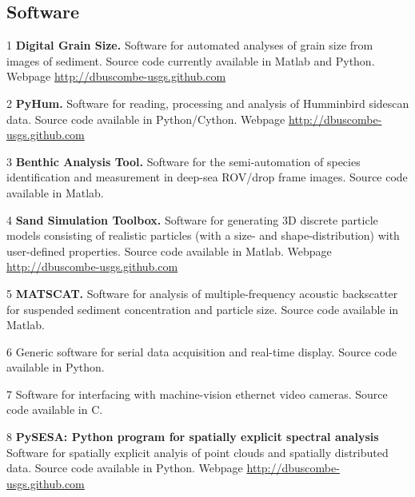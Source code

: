 \documentclass[margin,line]{resume}
\begin{document}
\begin{resume}
\begin{footnotesize}
\begin{list1}
	\end{list1}
        \end{footnotesize}

	\subsection{\mysidestyle Software}

        \begin{footnotesize}
	\begin{list1}
	 
	\item[1] {\bf Digital Grain Size.} Software for automated analyses of grain size from images of sediment. Source code currently available in Matlab and Python. Webpage \url{http://dbuscombe-usgs.github.com}\\
	\item[2] {\bf PyHum.} Software for reading, processing and analysis of Humminbird sidescan data. Source code available in Python/Cython. Webpage \url{http://dbuscombe-usgs.github.com}\\
	\item[3] {\bf Benthic Analysis Tool.} Software for the semi-automation of species identification and measurement in deep-sea ROV/drop frame images. Source code available in Matlab.\\
        \item[4] {\bf Sand Simulation Toolbox.} Software for generating 3D discrete particle models consisting of realistic particles (with a size- and shape-distribution) with user-defined properties. Source code available in Matlab. Webpage \url{http://dbuscombe-usgs.github.com}\\
        \item[5] {\bf MATSCAT.} Software for analysis of multiple-frequency acoustic backscatter for suspended sediment concentration and particle size. Source code available in Matlab.\\
      \item[6] Generic software for serial data acquisition and real-time display. Source code available in Python.\\
        \item[7] Software for interfacing with machine-vision ethernet video cameras. Source code available in C.\\
	\item[8] {\bf PySESA: Python program for spatially explicit spectral analysis } Software for spatially explicit analyis of point clouds and spatially distributed data. Source code available in Python. Webpage \url{http://dbuscombe-usgs.github.com}


\end{list1}
\end{footnotesize}
\end{resume}
\end{document}
